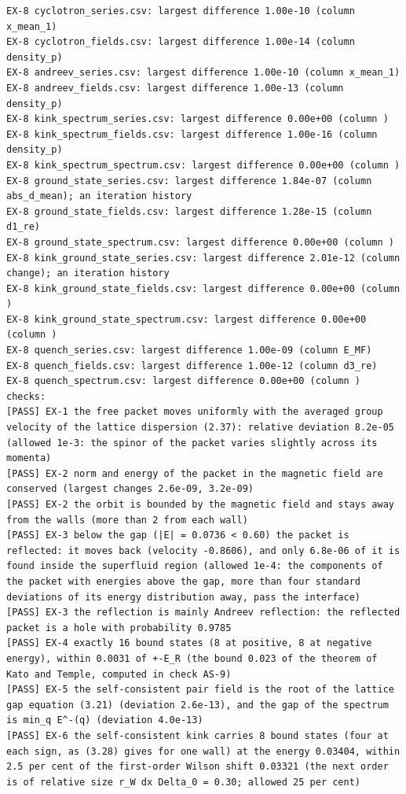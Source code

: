 \documentclass[
  10pt,
]{article}
\begin{document}
\begin{verbatim}
EX-8 cyclotron_series.csv: largest difference 1.00e-10 (column x_mean_1)
EX-8 cyclotron_fields.csv: largest difference 1.00e-14 (column density_p)
EX-8 andreev_series.csv: largest difference 1.00e-10 (column x_mean_1)
EX-8 andreev_fields.csv: largest difference 1.00e-13 (column density_p)
EX-8 kink_spectrum_series.csv: largest difference 0.00e+00 (column )
EX-8 kink_spectrum_fields.csv: largest difference 1.00e-16 (column density_p)
EX-8 kink_spectrum_spectrum.csv: largest difference 0.00e+00 (column )
EX-8 ground_state_series.csv: largest difference 1.84e-07 (column abs_d_mean); an iteration history
EX-8 ground_state_fields.csv: largest difference 1.28e-15 (column d1_re)
EX-8 ground_state_spectrum.csv: largest difference 0.00e+00 (column )
EX-8 kink_ground_state_series.csv: largest difference 2.01e-12 (column change); an iteration history
EX-8 kink_ground_state_fields.csv: largest difference 0.00e+00 (column )
EX-8 kink_ground_state_spectrum.csv: largest difference 0.00e+00 (column )
EX-8 quench_series.csv: largest difference 1.00e-09 (column E_MF)
EX-8 quench_fields.csv: largest difference 1.00e-12 (column d3_re)
EX-8 quench_spectrum.csv: largest difference 0.00e+00 (column )
checks:
[PASS] EX-1 the free packet moves uniformly with the averaged group velocity of the lattice dispersion (2.37): relative deviation 8.2e-05 (allowed 1e-3: the spinor of the packet varies slightly across its momenta)
[PASS] EX-2 norm and energy of the packet in the magnetic field are conserved (largest changes 2.6e-09, 3.2e-09)
[PASS] EX-2 the orbit is bounded by the magnetic field and stays away from the walls (more than 2 from each wall)
[PASS] EX-3 below the gap (|E| = 0.0736 < 0.60) the packet is reflected: it moves back (velocity -0.8606), and only 6.8e-06 of it is found inside the superfluid region (allowed 1e-4: the components of the packet with energies above the gap, more than four standard deviations of its energy distribution away, pass the interface)
[PASS] EX-3 the reflection is mainly Andreev reflection: the reflected packet is a hole with probability 0.9785
[PASS] EX-4 exactly 16 bound states (8 at positive, 8 at negative energy), within 0.0031 of +-E_R (the bound 0.023 of the theorem of Kato and Temple, computed in check AS-9)
[PASS] EX-5 the self-consistent pair field is the root of the lattice gap equation (3.21) (deviation 2.6e-13), and the gap of the spectrum is min_q E^-(q) (deviation 4.0e-13)
[PASS] EX-6 the self-consistent kink carries 8 bound states (four at each sign, as (3.28) gives for one wall) at the energy 0.03404, within 2.5 per cent of the first-order Wilson shift 0.03321 (the next order is of relative size r_W dx Delta_0 = 0.30; allowed 25 per cent)

\end{verbatim}
\end{document}
